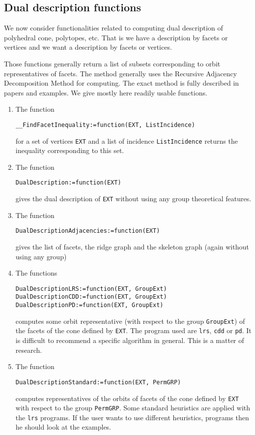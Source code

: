 \documentclass[12pt]{amsart}
\begin{document}
\subsection{Dual description functions}

We now consider functionalities related to computing dual description
of polyhedral cone, polytopes, etc. That is we have a description by
facets or vertices and we want a description by facets or vertices.

Those functions generally return a list of subsets corresponding to
orbit representatives of facets. The method generally uses the
Recursive Adjacency Decomposition Method for computing.
The exact method is fully described in papers and examples.
We give mostly here readily usable functions.

\begin{enumerate}
\item The function
\begin{verbatim}
__FindFacetInequality:=function(EXT, ListIncidence)
\end{verbatim}
for a set of vertices {\tt EXT} and a list of incidence {\tt ListIncidence}
returns the inequality corresponding to this set.

\item The function
\begin{verbatim}
DualDescription:=function(EXT)
\end{verbatim}
gives the dual description of {\tt EXT} without using any group theoretical
features.
\item The function
\begin{verbatim}
DualDescriptionAdjacencies:=function(EXT)
\end{verbatim}
gives the list of facets, the ridge graph and the skeleton graph (again without using any group)

\item The functions
\begin{verbatim}
DualDescriptionLRS:=function(EXT, GroupExt)
DualDescriptionCDD:=function(EXT, GroupExt)
DualDescriptionPD:=function(EXT, GroupExt)
\end{verbatim}
computes some orbit representative (with respect to the group {\tt GroupExt})
of the facets of the cone defined by {\tt EXT}.
The program used are {\tt lrs}, {\tt cdd} or {\tt pd}.
It is difficult to recommend a specific algorithm in general.
This is a matter of research.

\item The function
\begin{verbatim}
DualDescriptionStandard:=function(EXT, PermGRP)
\end{verbatim}
computes representatives of the orbits of facets of the cone defined by
{\tt EXT} with respect to the group {\tt PermGRP}.
Some standard heuristics are applied with the {\tt lrs} programs.
If the user wants to use different heuristics, programs then he should look
at the examples.


\end{enumerate}
\end{document}
